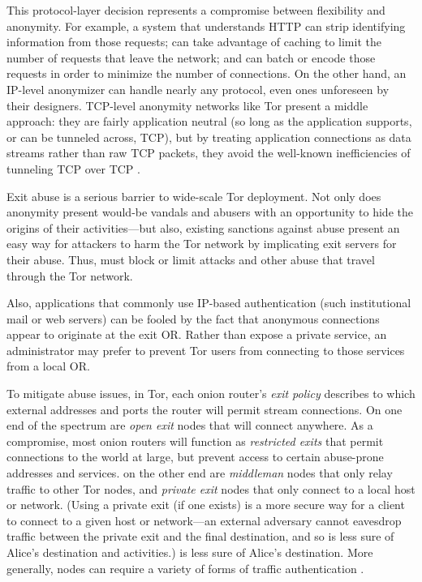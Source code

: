 \documentclass[times,10pt,twocolumn]{article}
\begin{document}
This protocol-layer decision represents a compromise between flexibility
and anonymity.  For example, a system that understands HTTP can strip
identifying information from those requests; can take advantage of
caching to limit the number of requests that leave the network; and can
batch or encode those requests in order to minimize the number of
connections.  On the other hand, an IP-level anonymizer can handle
nearly any protocol, even ones unforeseen by their designers.  TCP-level
anonymity networks like Tor present a middle approach: they are fairly
application neutral (so long as the application supports, or can be
tunneled across, TCP), but by treating application connections as data
streams rather than raw TCP packets, they avoid the well-known
inefficiencies of tunneling TCP over TCP \cite{tcp-over-tcp-is-bad}.



\label{subsec:exitpolicies}

Exit abuse is a serious barrier to wide-scale Tor deployment.  Not
only does anonymity present would-be vandals and abusers with an
opportunity to hide the origins of their activities---but also,
existing sanctions against abuse present an easy way for attackers to
harm the Tor network by implicating exit servers for their abuse.
Thus, must block or limit attacks and other abuse that travel through
the Tor network.

Also, applications that commonly use IP-based authentication (such
institutional mail or web servers) can be fooled by the fact that
anonymous connections appear to originate at the exit OR.  Rather than
expose a private service, an administrator may prefer to prevent Tor
users from connecting to those services from a local OR.

To mitigate abuse issues, in Tor, each onion router's \emph{exit
  policy} describes to which external addresses and ports the router
will permit stream connections. On one end of the spectrum are
\emph{open exit} nodes that will connect anywhere.  As a compromise,
most onion routers will function as \emph{restricted exits} that
permit connections to the world at large, but prevent access to
certain abuse-prone addresses and services.  on the other end are
\emph{middleman} nodes that only relay traffic to other Tor nodes, and
\emph{private exit} nodes that only connect to a local host or
network.  (Using a private exit (if one exists) is a more secure way
for a client to connect to a given host or network---an external
adversary cannot eavesdrop traffic between the private exit and the
final destination, and so is less sure of Alice's destination and
activities.)  is less sure of Alice's destination. More generally,
nodes can require a variety of forms of traffic authentication
\cite{or-discex00}.
\end{document}
